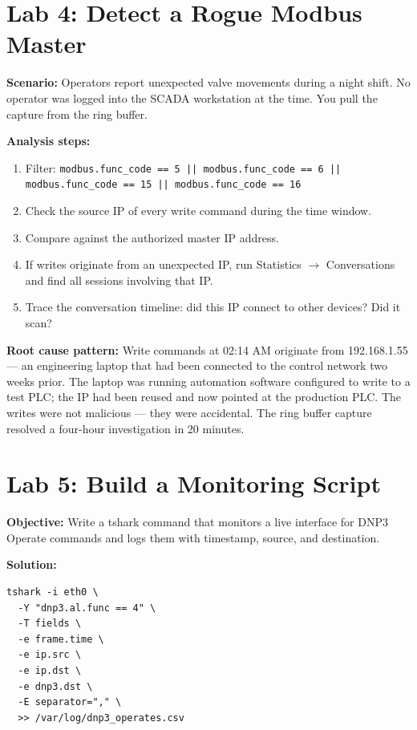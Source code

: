 \documentclass[12pt,twoside,openright]{memoir}
\newcommand{\filter}[1]{\texttt{\color{wsblue}#1}}
\begin{document}
\section{Lab 4: Detect a Rogue Modbus Master}

\textbf{Scenario:} Operators report unexpected valve movements during a night shift. No operator was logged into the SCADA workstation at the time. You pull the capture from the ring buffer.

\textbf{Analysis steps:}
\begin{enumerate}[noitemsep]
  \item Filter: \filter{modbus.func\_code == 5 || modbus.func\_code == 6 || modbus.func\_code == 15 || modbus.func\_code == 16}
  \item Check the source IP of every write command during the time window.
  \item Compare against the authorized master IP address.
  \item If writes originate from an unexpected IP, run Statistics $\to$ Conversations and find all sessions involving that IP.
  \item Trace the conversation timeline: did this IP connect to other devices? Did it scan?
\end{enumerate}

\textbf{Root cause pattern:} Write commands at 02:14 AM originate from 192.168.1.55 --- an engineering laptop that had been connected to the control network two weeks prior. The laptop was running automation software configured to write to a test PLC; the IP had been reused and now pointed at the production PLC. The writes were not malicious --- they were accidental. The ring buffer capture resolved a four-hour investigation in 20 minutes.

\section{Lab 5: Build a Monitoring Script}

\textbf{Objective:} Write a tshark command that monitors a live interface for DNP3 Operate commands and logs them with timestamp, source, and destination.

\textbf{Solution:}
\begin{lstlisting}
tshark -i eth0 \
  -Y "dnp3.al.func == 4" \
  -T fields \
  -e frame.time \
  -e ip.src \
  -e ip.dst \
  -e dnp3.dst \
  -E separator="," \
  >> /var/log/dnp3_operates.csv
\end{lstlisting}
\end{document}

